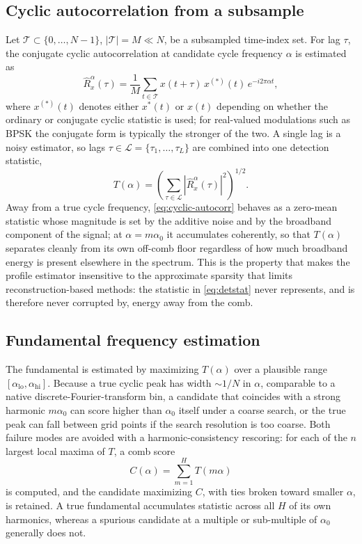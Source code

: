 \documentclass[10pt,twocolumn]{article}
\begin{document}
\subsection{Cyclic autocorrelation from a subsample}
Let $\mathcal{T} \subset \{0,\dots,N-1\}$, $|\mathcal{T}| = M \ll N$, be a
subsampled time-index set. For lag $\tau$, the conjugate cyclic
autocorrelation at candidate cycle frequency $\alpha$ is estimated as
\begin{equation}
\widehat{R}_x^{\alpha}(\tau) = \frac{1}{M}
  \sum_{t \in \mathcal{T}} x(t+\tau)\, x^{(*)}(t)\, e^{-i2\pi\alpha t},
\label{eq:cyclic-autocorr}
\end{equation}
where $x^{(*)}(t)$ denotes either $x^{*}(t)$ or $x(t)$ depending on
whether the ordinary or conjugate cyclic statistic is used; for real-valued
modulations such as BPSK the conjugate form is typically the stronger of
the two. A single lag is a noisy estimator, so lags $\tau \in
\mathcal{L} = \{\tau_1,\dots,\tau_L\}$ are combined into one detection
statistic,
\begin{equation}
T(\alpha) = \left( \sum_{\tau \in \mathcal{L}}
  \left| \widehat{R}_x^{\alpha}(\tau) \right|^2 \right)^{1/2}.
\label{eq:detstat}
\end{equation}
Away from a true cycle frequency, \eqref{eq:cyclic-autocorr} behaves as a
zero-mean statistic whose magnitude is set by the additive noise and by
the broadband component of the signal; at $\alpha = m\alpha_0$ it
accumulates coherently, so that $T(\alpha)$ separates cleanly from its own
off-comb floor regardless of how much broadband energy is present
elsewhere in the spectrum. This is the property that makes the profile
estimator insensitive to the approximate sparsity that limits
reconstruction-based methods: the statistic in \eqref{eq:detstat} never
represents, and is therefore never corrupted by, energy away from the comb.

\subsection{Fundamental frequency estimation}
The fundamental is estimated by maximizing $T(\alpha)$ over a plausible
range $[\alpha_{\mathrm{lo}}, \alpha_{\mathrm{hi}}]$. Because a true cyclic
peak has width $\sim 1/N$ in $\alpha$, comparable to a native
discrete-Fourier-transform bin, a candidate that coincides with a strong
harmonic $m\alpha_0$ can score higher than $\alpha_0$ itself under a
coarse search, or the true peak can fall between grid points if the search
resolution is too coarse. Both failure modes are avoided with a
harmonic-consistency rescoring: for each of the $n$ largest local maxima of
$T$, a comb score
\begin{equation}
C(\alpha) = \sum_{m=1}^{H} T(m\alpha)
\label{eq:combscore}
\end{equation}
is computed, and the candidate maximizing $C$, with ties broken toward
smaller $\alpha$, is retained. A true fundamental accumulates statistic
across all $H$ of its own harmonics, whereas a spurious candidate at a
multiple or sub-multiple of $\alpha_0$ generally does not.
\end{document}
